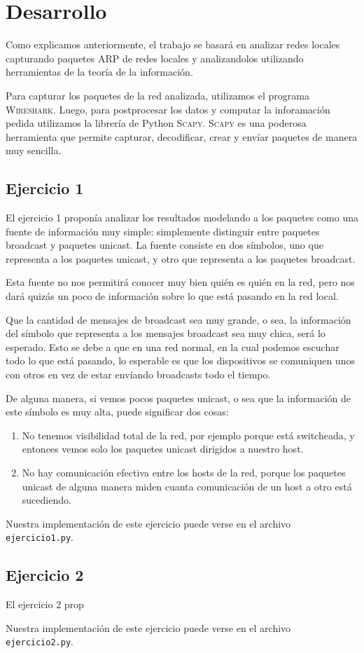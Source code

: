 \section{Desarrollo}

\PARstart Como explicamos anteriormente, el trabajo se basará en analizar redes locales capturando paquetes ARP de redes locales y analizandolos utilizando herramientas de la teoría de la información.

Para capturar los paquetes de la red analizada, utilizamos el programa \textsc{Wireshark}. Luego, para postprocesar los datos y computar la inforamación pedida utilizamos la librería de Python \textsc{Scapy}. \textsc{Scapy} es una poderosa herramienta que permite capturar, decodificar, crear y envíar paquetes de manera muy sencilla.

\subsection{Ejercicio 1}

El ejercicio 1 proponía analizar los resultados modelando a los paquetes como una fuente de información muy simple: simplemente distinguir entre paquetes broadcast y paquetes unicast. La fuente consiste en dos símbolos, uno que representa a los paquetes unicast, y otro que representa a los paquetes broadcast.

Esta fuente no nos permitirá conocer muy bien quién es quién en la red, pero nos dará quizás un poco de información sobre lo que está pasando en la red local.

Que la cantidad de mensajes de broadcast sea muy grande, o sea, la información del símbolo que representa a los mensajes broadcast sea muy chica, será lo esperado. Esto se debe a que en una red normal, en la cual podemos escuchar todo lo que está pasando, lo esperable es que los dispositivos se comuniquen unos con otros en vez de estar envíando broadcasts todo el tiempo.

De alguna manera, si vemos pocos paquetes unicast, o sea que la información de este símbolo es muy alta, puede significar dos cosas:

\begin{enumerate}
  \item No tenemos visibilidad total de la red, por ejemplo porque está switcheada, y entonces vemos solo los paquetes unicast dirigidos a nuestro host.
  \item No hay comunicación efectiva entre los hosts de la red, porque los paquetes unicast de alguna manera miden cuanta comunicación de un host a otro está sucediendo.
\end{enumerate}

Nuestra implementación de este ejercicio puede verse en el archivo \texttt{ejercicio1.py}.


\subsection{Ejercicio 2}

El ejercicio 2 prop


Nuestra implementación de este ejercicio puede verse en el archivo \texttt{ejercicio2.py}.
